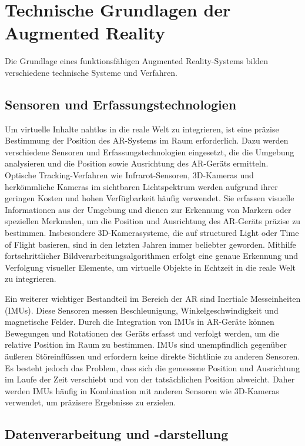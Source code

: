 \section{Technische Grundlagen der Augmented Reality}
Die Grundlage eines funktionsfähigen Augmented Reality-Systems bilden
verschiedene technische Systeme und Verfahren.

\subsection{Sensoren und Erfassungstechnologien}

Um virtuelle Inhalte nahtlos in die reale Welt zu integrieren, ist eine präzise
Bestimmung der Position des AR-Systems im Raum erforderlich. Dazu werden
verschiedene Sensoren und Erfassungstechnologien eingesetzt, die die Umgebung
analysieren und die Position sowie Ausrichtung des AR-Geräts ermitteln.
Optische Tracking-Verfahren wie Infrarot-Sensoren, 3D-Kameras und herkömmliche
Kameras im sichtbaren Lichtspektrum werden aufgrund ihrer geringen Kosten und
hohen Verfügbarkeit häufig verwendet. Sie erfassen visuelle Informationen aus
der Umgebung und dienen zur Erkennung von Markern oder speziellen Merkmalen, um
die Position und Ausrichtung des AR-Geräts präzise zu bestimmen. Insbesondere
3D-Kamerasysteme, die auf structured Light oder Time of Flight basieren, sind
in den letzten Jahren immer beliebter geworden. Mithilfe fortschrittlicher
Bildverarbeitungsalgorithmen erfolgt eine genaue Erkennung und Verfolgung
visueller Elemente, um virtuelle Objekte in Echtzeit in die reale Welt zu
integrieren.

Ein weiterer wichtiger Bestandteil im Bereich der AR sind Inertiale
Messeinheiten (IMUs). Diese Sensoren messen Beschleunigung,
Winkelgeschwindigkeit und magnetische Felder. Durch die Integration von IMUs in
AR-Geräte können Bewegungen und Rotationen des Geräts erfasst und verfolgt
werden, um die relative Position im Raum zu bestimmen. IMUs sind unempfindlich
gegenüber äußeren Störeinflüssen und erfordern keine direkte Sichtlinie zu
anderen Sensoren. Es besteht jedoch das Problem, dass sich die gemessene
Position und Ausrichtung im Laufe der Zeit verschiebt und von der tatsächlichen
Position abweicht. Daher werden IMUs häufig in Kombination mit anderen Sensoren
wie 3D-Kameras verwendet, um präzisere Ergebnisse zu erzielen.

\subsection{Datenverarbeitung und -darstellung}

